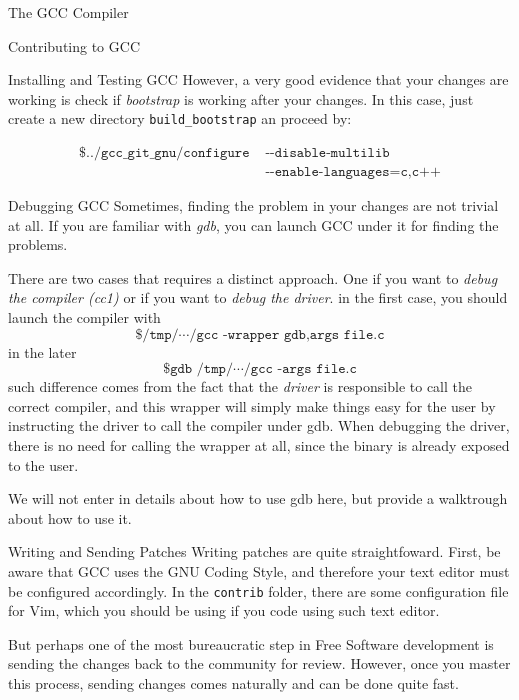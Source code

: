 \begin{section}{The GCC Compiler}
\begin{section}{Contributing to GCC}
\begin{subsection}{Installing and Testing GCC}
However, a very good evidence that your changes are working is check
if \textit{bootstrap} is working after your changes. In this case,
just create a new directory \texttt{build\_bootstrap} an proceed
by:

\begin{align}
\texttt{\$ ../gcc\_git\_gnu/configure} & \texttt{ -{}-disable-multilib} \nonumber \\
& \texttt{ -{}-enable-languages=c,c++} \nonumber
\end{align}


\end{subsection}

\begin{subsection}{Debugging GCC}
	Sometimes, finding the problem in your changes are not trivial at all. If you
	are familiar with \textit{gdb}, you can launch GCC under it for finding the
	problems.

	There are two cases that requires a distinct approach. One if you want
	to \textit{debug the compiler (cc1)} or if you want to \textit{debug the driver}.
	in the first case, you should launch the compiler with
	$$\texttt{\$ /tmp/}\cdots \texttt{/gcc -wrapper gdb,args file.c}$$
	in the later
	$$\texttt{\$ gdb /tmp/}\cdots \texttt{/gcc -args file.c}$$
	such difference comes from the fact that the \textit{driver} is responsible
	to call the correct compiler, and this wrapper will simply make things
	easy for the user by instructing the driver to call the compiler under gdb.
	When debugging the driver, there is no need for calling the wrapper at all,
	since the binary is already exposed to the user.

	We will not enter in details about how to use gdb here, but
	\cite{stallman1988debugging} provide a walktrough about how to use it.
\end{subsection}

\begin{subsection}{Writing and Sending Patches}
	Writing patches are quite straightfoward. First, be aware that GCC
	uses the GNU Coding Style, and therefore your text editor must be
	configured accordingly. In the \texttt{contrib} folder, there are
	some configuration file for Vim, which you should be using if
	you code using such text editor.

	But perhaps one of the most bureaucratic step in Free Software development
	is sending the changes back to the community for review. However, once
	you master this process, sending changes comes naturally and can be
	done quite fast.


\end{subsection}
\end{section}
\end{section}
